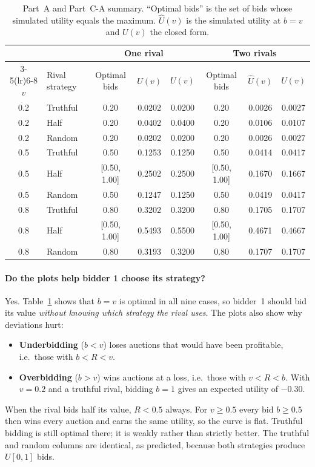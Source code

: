 \documentclass[11pt,a4paper]{article}
\begin{document}
\begin{table}[!htbp]
\centering
\caption{Part~A and Part~C-A summary. ``Optimal bids'' is the set of bids whose simulated utility equals the maximum. $\hat U(v)$ is the simulated utility at $b=v$ and $U(v)$ the closed form.}
\label{tab:p1a}
\small
\begin{tabular}{cl ccc ccc}
\toprule
& & \multicolumn{3}{c}{One rival} & \multicolumn{3}{c}{Two rivals} \\
\cmidrule(lr){3-5}\cmidrule(lr){6-8}
$v$ & Rival strategy & Optimal bids & $\hat U(v)$ & $U(v)$ & Optimal bids & $\hat U(v)$ & $U(v)$ \\
\midrule
0.2 & Truthful & 0.20 & 0.0202 & 0.0200 & 0.20 & 0.0026 & 0.0027 \\
0.2 & Half     & 0.20 & 0.0402 & 0.0400 & 0.20 & 0.0106 & 0.0107 \\
0.2 & Random   & 0.20 & 0.0202 & 0.0200 & 0.20 & 0.0026 & 0.0027 \\
0.5 & Truthful & 0.50 & 0.1253 & 0.1250 & 0.50 & 0.0414 & 0.0417 \\
0.5 & Half     & [0.50, 1.00] & 0.2502 & 0.2500 & [0.50, 1.00] & 0.1670 & 0.1667 \\
0.5 & Random   & 0.50 & 0.1247 & 0.1250 & 0.50 & 0.0419 & 0.0417 \\
0.8 & Truthful & 0.80 & 0.3202 & 0.3200 & 0.80 & 0.1705 & 0.1707 \\
0.8 & Half     & [0.50, 1.00] & 0.5493 & 0.5500 & [0.50, 1.00] & 0.4671 & 0.4667 \\
0.8 & Random   & 0.80 & 0.3193 & 0.3200 & 0.80 & 0.1707 & 0.1707 \\
\bottomrule
\end{tabular}
\end{table}

\paragraph{Do the plots help bidder 1 choose its strategy?} Yes. Table~\ref{tab:p1a} shows that
$b=v$ is optimal in all nine cases, so bidder~1 should bid its value \emph{without knowing which
strategy the rival uses}. The plots also show why deviations hurt:
\begin{itemize}[itemsep=0.1em]
  \item \textbf{Underbidding} ($b<v$) loses auctions that would have been profitable, i.e.\ those with $b<R<v$.
  \item \textbf{Overbidding} ($b>v$) wins auctions at a loss, i.e.\ those with $v<R<b$. With $v=0.2$ and a truthful rival, bidding $b=1$ gives an expected utility of $-0.30$.
\end{itemize}
When the rival bids half its value, $R<0.5$ always. For $v\ge 0.5$ every bid $b\ge 0.5$ then wins
every auction and earns the same utility, so the curve is flat. Truthful bidding is still optimal
there; it is weakly rather than strictly better. The truthful and random columns are identical, as
predicted, because both strategies produce $U[0,1]$ bids.
\end{document}
